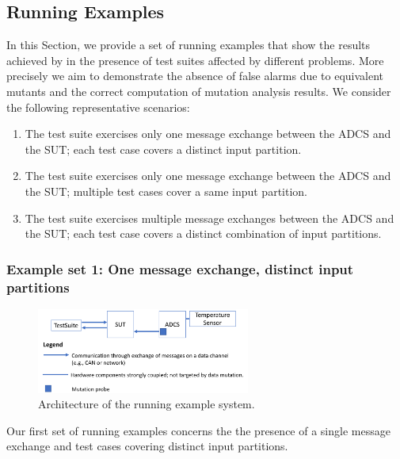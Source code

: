 \clearpage
\subsection{Running Examples}
\label{sec:dataDriven:example}

In this Section, we provide a set of running examples that show the results achieved by \APPR in the presence of test suites affected by different problems. More precisely we aim to demonstrate the absence of false alarms due to equivalent mutants and the correct computation of mutation analysis results. We consider the following representative scenarios:
\begin{enumerate}
\item The test suite exercises only one message exchange between the ADCS and the SUT; each test case covers a distinct input partition.
\item The test suite exercises only one message exchange between the ADCS and the SUT; multiple test cases cover a same input partition.
\item The test suite exercises multiple message exchanges between the ADCS and the SUT; each test case covers a distinct combination of input partitions.
\end{enumerate}


\subsubsection{Example set 1: One message exchange, distinct input partitions}
\label{sec:dataDriven:example:1}

\begin{figure}[tb]
\centering
\includegraphics[width=7cm]{damat/RunningExampleArch}
\caption{Architecture of the running example system.}
\label{fig:damat:RunningExampleArch}
\end{figure}

Our first set of running examples concerns the the presence of a single message exchange and test cases covering distinct input partitions.

